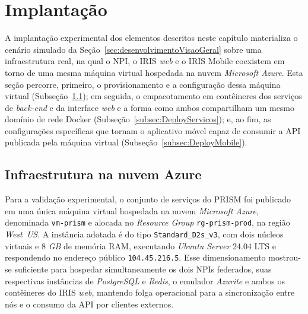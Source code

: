 
\section{Implantação}\label{sec:Implantacao}

A implantação experimental dos elementos descritos neste capítulo materializa o cenário simulado da Seção~\ref{sec:desenvolvimentoVisaoGeral} sobre uma infraestrutura real, na qual o NPI, o IRIS \emph{web} e o IRIS Mobile coexistem em torno de uma mesma máquina virtual hospedada na nuvem \textit{Microsoft Azure}. Esta seção percorre, primeiro, o provisionamento e a configuração dessa máquina virtual (Subseção~\ref{subsec:DeployAzure}); em seguida, o empacotamento em contêineres dos serviços de \textit{back-end} e da interface \emph{web} e a forma como ambos compartilham um mesmo domínio de rede Docker (Subseção~\ref{subsec:DeployServicos}); e, ao fim,  as configurações específicas que tornam o aplicativo móvel capaz de consumir a API publicada pela máquina virtual (Subseção~\ref{subsec:DeployMobile}).

\subsection{Infraestrutura na nuvem Azure}\label{subsec:DeployAzure}

Para a validação experimental, o conjunto de serviços do PRISM foi publicado em uma única máquina virtual hospedada na nuvem \textit{Microsoft Azure}, denominada \texttt{vm-prism} e alocada no \textit{Resource Group} \texttt{rg-prism-prod}, na região \textit{West~US}. A instância adotada é do tipo \texttt{Standard\_D2s\_v3}, com dois núcleos virtuais e 8 \textit{GB} de memória RAM, executando \textit{Ubuntu Server} 24.04 LTS e respondendo no endereço público \texttt{104.45.216.5}. Esse dimensionamento mostrou-se suficiente para hospedar simultaneamente os dois NPIs federados, suas respectivas instâncias de \textit{PostgreSQL} e \textit{Redis}, o emulador \textit{Azurite} e ambos os contêineres do IRIS \emph{web}, mantendo folga operacional para a sincronização entre nós e o consumo da API por clientes externos.

